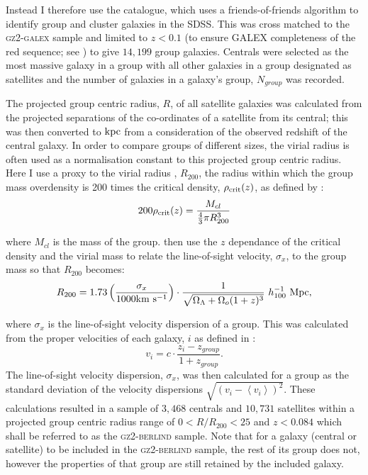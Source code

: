 Instead I therefore use the \citet{berlind06} catalogue, which uses a friends-of-friends algorithm to identify group and cluster galaxies in the SDSS. This was cross matched to the \textsc{gz2-galex} sample and limited to $z < 0.1$ (to ensure GALEX completeness of the red sequence; see \citealt{wyder07, yesuf14}) to give $14,199$ group galaxies. Centrals were selected as the most massive galaxy in a group \citep[as in][]{yang07, yang09, pasquali10} with all other galaxies in a group designated as satellites and the number of galaxies in a galaxy's group, $N_{group}$ was recorded. 

The projected group centric radius, $R$, of all satellite galaxies was calculated from the projected separations of the co-ordinates of a satellite from its central; this was then converted to $\rm{kpc}$ from a consideration of the observed redshift of the central galaxy. In order to compare groups of different sizes, the virial radius is often used as a normalisation constant to this projected group centric radius. Here I use a proxy to the virial radius \citep[see][]{navarro95}, $R_{200}$, the radius within which the group mass overdensity is 200 times the critical density, $\rho_{\rm{crit}}(z)$, as defined by \citealt{finn05}:
\begin{equation}\label{eq:overdense}
200\rho_{\rm{crit}}(z) = \frac{M_{cl}}{\frac{4}{3}\pi R_{200}^3}
\end{equation}

where $M_{cl}$ is the mass of the group. \citeauthor{finn05} then use the $z$ dependance of the critical density and the virial mass to relate the line-of-sight velocity, $\sigma_x$, to the group mass so that $R_{200}$ becomes:
\begin{equation}\label{eq:r200}
R_{200} = 1.73 \left ( \frac{\sigma_x}{1000 \rm{km}~\rm{s}^{-1}} \right) \cdot \frac{1}{\sqrt{\Omega_{\Lambda} +\Omega_o(1+z)^3}} ~ h_{100}^{-1} ~\rm{Mpc}, 
\end{equation}

where $\sigma_x$ is the line-of-sight velocity dispersion of a group. This was calculated from the proper velocities of each galaxy, $i$ as defined in \cite{danese80}:
\begin{equation}\label{eq:propervel}
v_i = c \cdot \frac{z_i - z_{group}}{1 + z_{group}}.
\end{equation}
The line-of-sight velocity dispersion, $\sigma_x$, was then calculated for a group as the standard deviation of the velocity dispersions $\sqrt{(v_i - \left< v_i\right>)^2}$. These calculations resulted in a sample of $3,468$ centrals and $10,731$ satellites within a projected group centric radius range of $0 < R/R_{200} < 25$ and $z < 0.084$ which shall be referred to as the \textsc{gz2-berlind} sample. Note that for a galaxy (central or satellite) to be included in the \textsc{gz2-berlind} sample, the rest of its group does not, however the properties of that group are still retained by the included galaxy. 

